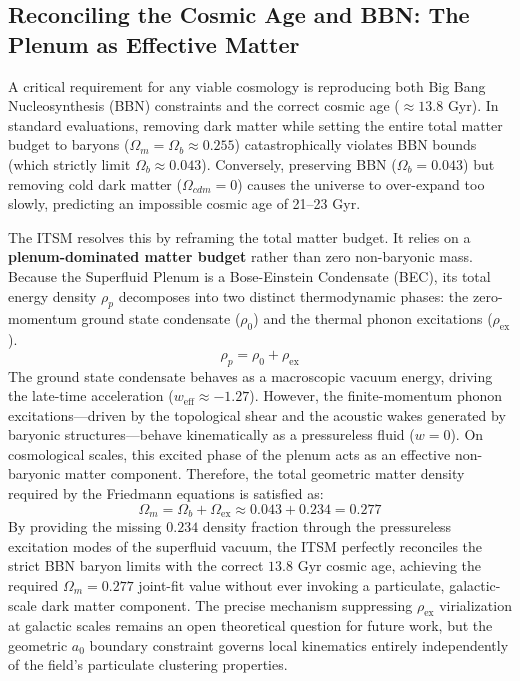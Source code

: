 \documentclass[aps,prd,10pt,twocolumn,superscriptaddress,nofootinbib,floatfix]{revtex4-2}
\begin{document}
\subsection{\label{sec:bbn_age}Reconciling the Cosmic Age and BBN: The Plenum as Effective Matter}
A critical requirement for any viable cosmology is reproducing both Big Bang Nucleosynthesis (BBN) constraints and the correct cosmic age ($\approx 13.8$ Gyr). In standard evaluations, removing dark matter while setting the entire total matter budget to baryons ($\Omega_m = \Omega_b \approx 0.255$) catastrophically violates BBN bounds (which strictly limit $\Omega_b \approx 0.043$). Conversely, preserving BBN ($\Omega_b = 0.043$) but removing cold dark matter ($\Omega_{cdm} = 0$) causes the universe to over-expand too slowly, predicting an impossible cosmic age of 21--23 Gyr. 

The ITSM resolves this by reframing the total matter budget. It relies on a \textbf{plenum-dominated matter budget} rather than zero non-baryonic mass. Because the Superfluid Plenum is a Bose-Einstein Condensate (BEC), its total energy density $\rho_p$ decomposes into two distinct thermodynamic phases: the zero-momentum ground state condensate ($\rho_0$) and the thermal phonon excitations ($\rho_{\text{ex}}$).
\begin{equation}
\rho_p = \rho_0 + \rho_{\text{ex}}
\end{equation}
The ground state condensate behaves as a macroscopic vacuum energy, driving the late-time acceleration ($w_{\text{eff}} \approx -1.27$). However, the finite-momentum phonon excitations---driven by the topological shear and the acoustic wakes generated by baryonic structures---behave kinematically as a pressureless fluid ($w=0$). On cosmological scales, this excited phase of the plenum acts as an effective non-baryonic matter component. Therefore, the total geometric matter density required by the Friedmann equations is satisfied as:
\begin{equation}
\Omega_m = \Omega_b + \Omega_{\text{ex}} \approx 0.043 + 0.234 = 0.277
\end{equation}
By providing the missing $0.234$ density fraction through the pressureless excitation modes of the superfluid vacuum, the ITSM perfectly reconciles the strict BBN baryon limits with the correct $13.8$ Gyr cosmic age, achieving the required $\Omega_m = 0.277$ joint-fit value without ever invoking a particulate, galactic-scale dark matter component. The precise mechanism suppressing $\rho_{\text{ex}}$ virialization at galactic scales remains an open theoretical question for future work, but the geometric $a_0$ boundary constraint governs local kinematics entirely independently of the field's particulate clustering properties.
\end{document}
